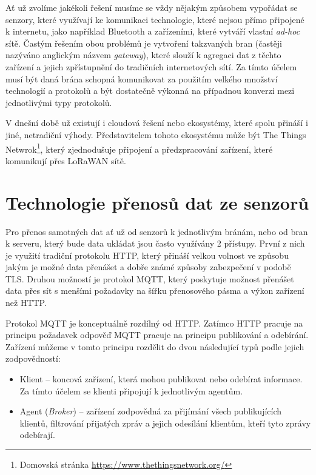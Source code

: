 Ať už zvolíme jakékoli řešení musíme se vždy nějakým způsobem vypořádat se senzory, které využívají ke komunikaci technologie, které nejsou přímo připojené k internetu, jako například Bluetooth a zařízeními, které vytváří vlastní \textit{ad-hoc} sítě. Častým řešením obou problémů je vytvoření takzvaných bran \cite{zhu2010iot} (častěji nazýváno anglickým názvem \textit{gateway}), které slouží k agregaci dat z těchto zařízení a jejich zpřístupnění do tradičních internetových sítí. Za tímto účelem musí být daná brána schopná komunikovat za použitím velkého množství technologií a protokolů a být dostatečně výkonná na případnou konverzi mezi jednotlivými typy protokolů. 

V dnešní době už existují i cloudová řešení nebo ekosystémy, které spolu přináší i jiné, netradiční výhody. Představitelem tohoto ekosystému může být The Things Netwrok\footnote{Domovská stránka \url{https://www.thethingsnetwork.org/}}, který zjednodušuje připojení a předzpracování zařízení, které komunikují přes LoRaWAN sítě. 

\section{Technologie přenosů dat ze senzorů} %

Pro přenos samotných dat ať už od senzorů k jednotlivým bránám, nebo od bran k serveru, který bude data ukládat jsou často využívány 2 přístupy. První z nich je využití tradiční protokolu HTTP, který přináší velkou volnost ve způsobu jakým je možné data přenášet a dobře známé způsoby zabezpečení v podobě TLS. Druhou možností je protokol MQTT, který poskytuje možnost přenášet data přes sít s menšími požadavky na šířku přenosového pásma a výkon zařízení \cite{7814989} než HTTP.

Protokol MQTT je konceptuálně rozdílný od HTTP. Zatímco HTTP pracuje na principu požadavek odpověď MQTT pracuje na principu publikování a odebírání. Zařízení můžeme v tomto principu rozdělit do dvou následující typů podle jejich zodpovědností:

\begin{itemize}
\item Klient -- koncová zařízení, která mohou publikovat nebo odebírat informace. Za tímto účelem se klienti připojují k jednotlivým agentům.
\item Agent (\textit{Broker}) -- zařízení zodpovědná za přijímání všech publikujících klientů, filtrování přijatých zpráv a jejich odesílání klientům, kteří tyto zprávy odebírají.
\end{itemize}


